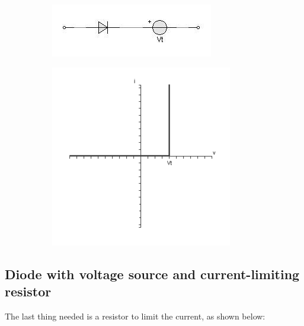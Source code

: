 \begin{figure}[H]
  \centering
  \begin{subfigure}{.45\textwidth}
    \centering
    \includegraphics[width=\linewidth]{figures/Diode_Modelling_Image6}
  \end{subfigure}
  \begin{subfigure}{.4\textwidth}
    \centering
    \includegraphics[width=\linewidth]{figures/Diode_Modelling_Image8}
  \end{subfigure}
\end{figure}

\subsection{Diode with voltage source and current-limiting resistor}

The last thing needed is a resistor to limit the current, as shown below:

